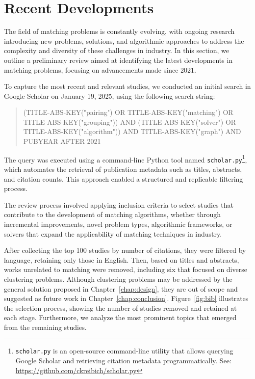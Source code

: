         

   \section{Recent Developments}

    The field of matching problems is constantly evolving, with ongoing research introducing new problems, solutions, and algorithmic approaches to address the complexity and diversity of these challenges in industry. In this section, we outline a preliminary review aimed at identifying the latest developments in matching problems, focusing on advancements made since 2021.

    To capture the most recent and relevant studies, we conducted an initial search in Google Scholar on January 19, 2025, using the following search string:

    \begin{quote}
    (TITLE-ABS-KEY("pairing") OR TITLE-ABS-KEY("matching") OR TITLE-ABS-KEY("grouping")) AND (TITLE-ABS-KEY("solver") OR TITLE-ABS-KEY("algorithm")) AND TITLE-ABS-KEY("graph") AND PUBYEAR AFTER 2021
    \end{quote}

    The query was executed using a command-line Python tool named \texttt{scholar.py}\footnote{\texttt{scholar.py} is an open-source command-line utility that allows querying Google Scholar and retrieving citation metadata programmatically. See: \url{https://github.com/ckreibich/scholar.py}}, which automates the retrieval of publication metadata such as titles, abstracts, and citation counts. This approach enabled a structured and replicable filtering process.

    The review process involved applying inclusion criteria to select studies that contribute to the development of matching algorithms, whether through incremental improvements, novel problem types, algorithmic frameworks, or solvers that expand the applicability of matching techniques in industry.

    After collecting the top 100 studies by number of citations, they were filtered by language, retaining only those in English. Then, based on titles and abstracts, works unrelated to matching were removed, including six that focused on diverse clustering problems. Although clustering problems may be addressed by the general solution proposed in Chapter~\ref{chap:design}, they are out of scope and suggested as future work in Chapter~\ref{chap:conclusion}. Figure~\ref{fig:bib} illustrates the selection process, showing the number of studies removed and retained at each stage. Furthermore, we analyze the most prominent topics that emerged from the remaining studies.

